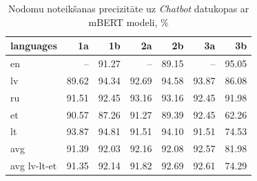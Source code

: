 \begin{table}[htbp]
  \centering
  \caption{Nodomu noteikšanas precizitāte uz \textit{Chatbot} datukopas ar mBERT modeli, \%}
    \begin{tabular}{lrrrrrr} \toprule
    languages & 1a & 1b & 2a & 2b & 3a & 3b \\\midrule
    en    &   --    & \cellcolor[rgb]{ .984,  .973,  .984}91.27 &   --    & \cellcolor[rgb]{ .984,  .929,  .941}89.15 &   --    & \cellcolor[rgb]{ .353,  .541,  .776}95.05 \\
    lv    & \cellcolor[rgb]{ .984,  .941,  .953}89.62 & \cellcolor[rgb]{ .502,  .647,  .831}94.34 & \cellcolor[rgb]{ .851,  .894,  .953}92.69 & \cellcolor[rgb]{ .455,  .612,  .812}94.58 & \cellcolor[rgb]{ .604,  .718,  .867}93.87 & \cellcolor[rgb]{ .984,  .871,  .882}86.08 \\
    ru    & \cellcolor[rgb]{ .984,  .976,  .988}91.51 & \cellcolor[rgb]{ .902,  .925,  .969}92.45 & \cellcolor[rgb]{ .753,  .824,  .918}93.16 & \cellcolor[rgb]{ .753,  .824,  .918}93.16 & \cellcolor[rgb]{ .902,  .925,  .969}92.45 & \cellcolor[rgb]{ .984,  .984,  .996}91.98 \\
    et    & \cellcolor[rgb]{ .984,  .957,  .969}90.57 & \cellcolor[rgb]{ .984,  .894,  .906}87.26 & \cellcolor[rgb]{ .984,  .973,  .984}91.27 & \cellcolor[rgb]{ .984,  .933,  .945}89.39 & \cellcolor[rgb]{ .902,  .925,  .969}92.45 & \cellcolor[rgb]{ .973,  .412,  .42}62.26 \\
    lt    & \cellcolor[rgb]{ .604,  .718,  .867}93.87 & \cellcolor[rgb]{ .404,  .576,  .796}94.81 & \cellcolor[rgb]{ .984,  .976,  .988}91.51 & \cellcolor[rgb]{ .553,  .682,  .847}94.10 & \cellcolor[rgb]{ .984,  .976,  .988}91.51 & \cellcolor[rgb]{ .976,  .647,  .655}74.53 \\\midrule
    avg   & \cellcolor[rgb]{ .984,  .973,  .984}91.39 & \cellcolor[rgb]{ .988,  .988,  1}92.03 & \cellcolor[rgb]{ .965,  .973,  .992}92.16 & \cellcolor[rgb]{ .98,  .984,  1}92.08 & \cellcolor[rgb]{ .875,  .91,  .961}92.57 & \cellcolor[rgb]{ .98,  .792,  .804}81.98 \\
    avg lv-lt-et & \cellcolor[rgb]{ .984,  .973,  .984}91.35 & \cellcolor[rgb]{ .969,  .973,  .992}92.14 & \cellcolor[rgb]{ .984,  .98,  .992}91.82 & \cellcolor[rgb]{ .851,  .894,  .953}92.69 & \cellcolor[rgb]{ .867,  .906,  .961}92.61 & \cellcolor[rgb]{ .976,  .643,  .651}74.29 \\\bottomrule
    \end{tabular}%
  \label{tab:chatbot-bert}%
\end{table}%




